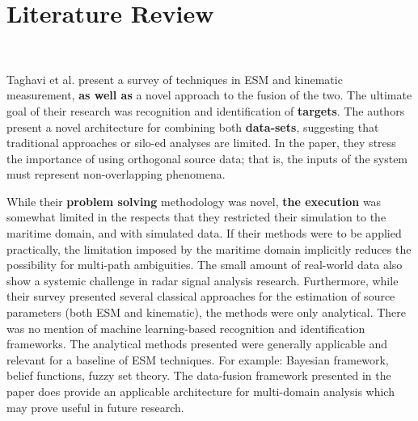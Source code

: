 \section{Literature Review}~\label{sec:literature}

Taghavi et al. \cite{taghavi_object_2016} present a survey of techniques in ESM and kinematic measurement, \textbf{as well as} a novel approach to the fusion of the two. 
The ultimate goal of their research was recognition and identification of \textbf{targets}. 
The authors present a novel architecture for combining both \textbf{data-sets}, suggesting that traditional approaches or silo-ed analyses are limited. 
In the paper, they stress the importance of using orthogonal source data; that is, the inputs of the system must represent non-overlapping phenomena. 

While their \textbf{problem solving} methodology was novel, \textbf{the execution} was somewhat limited in the respects that they restricted their simulation to the maritime domain, and with simulated data. If their methods were to be applied practically, the limitation imposed by the maritime domain implicitly reduces the possibility for multi-path ambiguities. The small amount of real-world data also show a systemic challenge in radar signal analysis research. Furthermore, while their survey presented several classical approaches for the estimation of source parameters (both ESM and kinematic), the methods were only analytical. There was no mention of machine learning-based recognition and identification frameworks. The analytical methods presented were generally applicable and relevant for a baseline of ESM techniques. For example: Bayesian framework, belief functions, fuzzy set theory. The data-fusion framework presented in the paper does provide an applicable architecture for multi-domain analysis which may prove useful in future research. %

